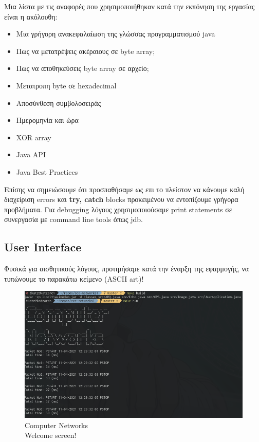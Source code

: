 \documentclass[hidelinks, 12pt, a4paper]{article}
\begin{document}
Μια λίστα με τις αναφορές που χρησιμοποιήθηκαν κατά την εκπόνηση της εργασίας είναι η ακόλουθη:

\begin{itemize}
    \item Μια γρήγορη ανακεφαλαίωση της γλώσσας προγραμματισμού java \cite{derek}
    \item Πως να μετατρέψεις ακέραιους σε byte array; \cite{int2byte}
    \item Πως να αποθηκεύσεις byte array σε αρχείο; \cite{javafile}
    \item Μετατροπη byte σε hexadecimal \cite{programizhex}
    \item Αποσύνθεση συμβολοσειράς \cite{stackparsestring}
    \item Ημερομηνία και ώρα \cite{timeAndDate}
    \item XOR array \cite{xor}
    \item Java API \cite{javaDocs}
    \item Java Best Practices \cite{javaPractice}
\end{itemize}

Επίσης να σημειώσουμε ότι προσπαθήσαμε ως επι το πλείστον να κάνουμε καλή διαχείριση errors και \textbf{try, catch} blocks προκειμένου να εντοπίζουμε γρήγορα προβλήματα. Για debugging λόγους χρησιμοποιούσαμε print statements σε συνεργασία με command line tools όπως jdb.

\subsection{User Interface}

Φυσικά για αισθητικούς λόγους, προτιμήσαμε κατά την έναρξη της εφαρμογής, να τυπώνουμε το παρακάτω κείμενο (ASCII art)!

\begin{figure}[h!]
\centering
	\includegraphics[height=.3\textheight, width=.8\textwidth]{assets/ui_welcome.png}
	\caption{Computer Networks \\ Welcome screen!} 
\end{figure}
\end{document}
